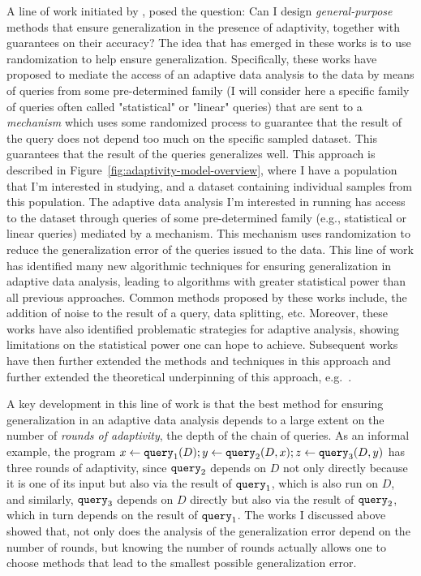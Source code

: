A line of work initiated by \cite{DworkFHPRR15}, \cite{HardtU14} posed the question: Can I design \emph{general-purpose} methods that ensure generalization in the presence of adaptivity, together with guarantees on their accuracy?  
The idea that has emerged in these works is to use randomization to help ensure generalization. 
Specifically, these works have proposed to mediate the access of an adaptive data analysis to the data by means of queries from some pre-determined family (I will consider here a specific family of queries often called "statistical" or "linear" queries) that are sent to a 
\emph{mechanism} which uses some randomized process to guarantee that the result of the query does not depend too much on the specific
sampled dataset. 
This guarantees that the result of the queries generalizes well. 
This approach is described in Figure~\ref{fig:adaptivity-model-overview}, where
I have a population that I'm interested in studying, and a dataset containing individual samples from this population. The adaptive data analysis I'm interested in running has access to the dataset through queries of some pre-determined family (e.g., statistical or linear queries) mediated by a mechanism. 
This mechanism uses randomization to reduce the generalization error of the queries issued to the data.
This line of work has identified many new algorithmic techniques for ensuring generalization in adaptive data analysis, leading to algorithms with greater statistical power than all previous approaches. 
Common methods proposed by these works include, the addition of noise to the result of a query, data splitting, etc. 
Moreover, these works have also identified problematic strategies for adaptive analysis, showing limitations on the statistical power one can hope to achieve. 
Subsequent works have then further extended the methods and techniques in this approach and further extended the theoretical underpinning of this approach, 
e.g.~\cite{dwork2015reusable,dwork2015generalization,BassilyNSSSU16,UllmanSNSS18,FeldmanS17,jung2019new,SteinkeZ20,RogersRSSTW20}.
%

A key development in this line of work is that the best method for ensuring generalization in an adaptive data analysis depends to a large extent on the number of \emph{rounds of adaptivity}, the depth of the chain of queries. 
As an informal example, the program $x \leftarrow {\tt query}_1(D);y \leftarrow {\tt query}_2(D,x);z \leftarrow {\tt query}_3(D,y)$ has three rounds of adaptivity, since ${\tt query}_2$  depends on $D$ not only directly because it is one of its input but also via the result of ${\tt query}_1$, 
which is also run on $D$, and similarly,  ${\tt query}_3$ depends on $D$ directly but also via the result of ${\tt query}_2$, which in turn depends on the result of ${\tt query}_1$. 
The works I discussed above showed that, not only does the analysis of the generalization error depend on the number of rounds, 
but knowing the number of rounds actually allows one to choose methods that lead to the smallest possible generalization error. 

